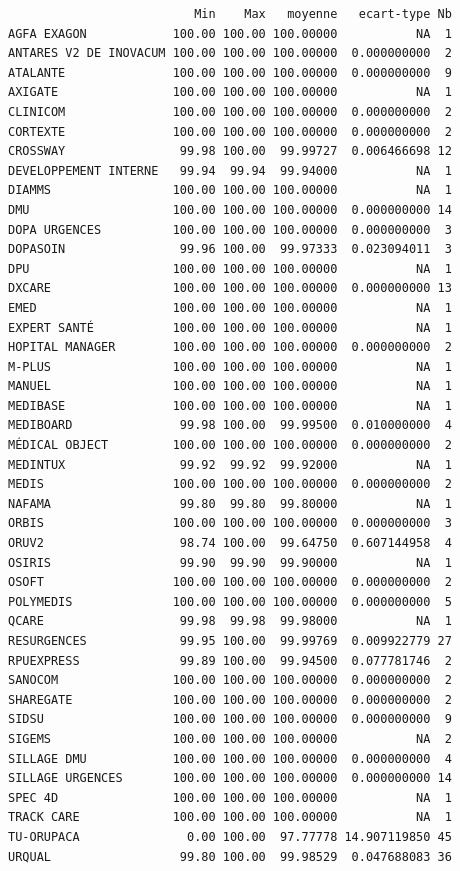 \documentclass[]{article}
\begin{document}
\begin{verbatim}
                          Min    Max   moyenne   ecart-type Nb
AGFA EXAGON            100.00 100.00 100.00000           NA  1
ANTARES V2 DE INOVACUM 100.00 100.00 100.00000  0.000000000  2
ATALANTE               100.00 100.00 100.00000  0.000000000  9
AXIGATE                100.00 100.00 100.00000           NA  1
CLINICOM               100.00 100.00 100.00000  0.000000000  2
CORTEXTE               100.00 100.00 100.00000  0.000000000  2
CROSSWAY                99.98 100.00  99.99727  0.006466698 12
DEVELOPPEMENT INTERNE   99.94  99.94  99.94000           NA  1
DIAMMS                 100.00 100.00 100.00000           NA  1
DMU                    100.00 100.00 100.00000  0.000000000 14
DOPA URGENCES          100.00 100.00 100.00000  0.000000000  3
DOPASOIN                99.96 100.00  99.97333  0.023094011  3
DPU                    100.00 100.00 100.00000           NA  1
DXCARE                 100.00 100.00 100.00000  0.000000000 13
EMED                   100.00 100.00 100.00000           NA  1
EXPERT SANTÉ           100.00 100.00 100.00000           NA  1
HOPITAL MANAGER        100.00 100.00 100.00000  0.000000000  2
M-PLUS                 100.00 100.00 100.00000           NA  1
MANUEL                 100.00 100.00 100.00000           NA  1
MEDIBASE               100.00 100.00 100.00000           NA  1
MEDIBOARD               99.98 100.00  99.99500  0.010000000  4
MÉDICAL OBJECT         100.00 100.00 100.00000  0.000000000  2
MEDINTUX                99.92  99.92  99.92000           NA  1
MEDIS                  100.00 100.00 100.00000  0.000000000  2
NAFAMA                  99.80  99.80  99.80000           NA  1
ORBIS                  100.00 100.00 100.00000  0.000000000  3
ORUV2                   98.74 100.00  99.64750  0.607144958  4
OSIRIS                  99.90  99.90  99.90000           NA  1
OSOFT                  100.00 100.00 100.00000  0.000000000  2
POLYMEDIS              100.00 100.00 100.00000  0.000000000  5
QCARE                   99.98  99.98  99.98000           NA  1
RESURGENCES             99.95 100.00  99.99769  0.009922779 27
RPUEXPRESS              99.89 100.00  99.94500  0.077781746  2
SANOCOM                100.00 100.00 100.00000  0.000000000  2
SHAREGATE              100.00 100.00 100.00000  0.000000000  2
SIDSU                  100.00 100.00 100.00000  0.000000000  9
SIGEMS                 100.00 100.00 100.00000           NA  2
SILLAGE DMU            100.00 100.00 100.00000  0.000000000  4
SILLAGE URGENCES       100.00 100.00 100.00000  0.000000000 14
SPEC 4D                100.00 100.00 100.00000           NA  1
TRACK CARE             100.00 100.00 100.00000           NA  1
TU-ORUPACA               0.00 100.00  97.77778 14.907119850 45
URQUAL                  99.80 100.00  99.98529  0.047688083 36
\end{verbatim}
\end{document}
